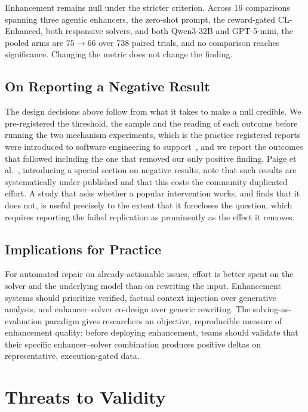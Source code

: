 \documentclass[journal]{IEEEtran}
\newcommand{\ourmethod}{CL-Enhanced}
\begin{document}
Enhancement remains null under the stricter criterion. Across 16 comparisons spanning three agentic enhancers, the zero-shot prompt, the reward-gated \ourmethod{}, both responsive solvers, and both Qwen3-32B and GPT-5-mini, the pooled arms are $75 \rightarrow 66$ over 738 paired trials, and no comparison reaches significance. Changing the metric does not change the finding.

\subsection{On Reporting a Negative Result}

The design decisions above follow from what it takes to make a null credible. We pre-registered
the threshold, the sample and the reading of each outcome before running the two mechanism
experiments, which is the practice registered reports were introduced to software engineering
to support~\cite{ernst2023registered}, and we report the outcomes that followed including the
one that removed our only positive finding. Paige et al.~\cite{paige2017negative}, introducing
a special section on negative results, note that such results are systematically
under-published and that this costs the community duplicated effort. A study that asks whether
a popular intervention works, and finds that it does not, is useful precisely to the extent
that it forecloses the question, which requires reporting the failed replication as
prominently as the effect it removes.

\subsection{Implications for Practice}
For automated repair on already-actionable issues, effort is better spent on the solver and the underlying model than on rewriting the input. Enhancement systems should prioritize verified, factual context injection over generative analysis, and enhancer--solver co-design over generic rewriting. The solving-as-evaluation paradigm gives researchers an objective, reproducible measure of enhancement quality; before deploying enhancement, teams should validate that their specific enhancer--solver combination produces positive deltas on representative, execution-gated data.

\section{Threats to Validity}
\label{sec:threats}
\end{document}
